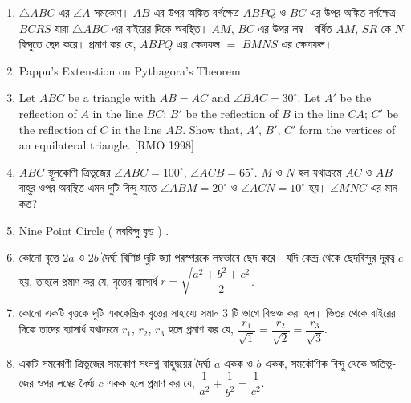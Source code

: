 \documentclass[11pt, a4paper]{article}
\begin{document}
\begin{enumerate}
	 
	 \item $ \bigtriangleup ABC $ \textbengali{এর} $ \angle A $ \textbengali{সমকোণ।} $AB$ \textbengali{এর উপর অঙ্কিত বর্গক্ষেত্র} $ABPQ$ \textbengali{ও} $BC$ \textbengali{এর উপর অঙ্কিত বর্গক্ষেত্র} $BCRS$ \textbengali{যারা} $ \bigtriangleup ABC $ \textbengali{এর বাইরের দিকে অবস্থিত।} $AM$, $BC$ \textbengali{এর উপর লম্ব। বর্ধিত} $AM$, $SR$ \textbengali{কে} $N$ \textbengali{বিন্দুতে ছেদ করে। প্রমাণ কর যে,} $ABPQ$ \textbengali{এর ক্ষেত্রফল} $=$ $BMNS$ \textbengali{এর ক্ষেত্রফল।}
	 
	 \item Pappu's Extenstion on Pythagora's Theorem.
	 
	 \item Let $ABC$ be a triangle with $AB = AC$ and $\angle BAC = 30^{\circ} $. Let $A'$ be the reflection of $A$ in the line $BC$; $B'$ be the reflection of $B$ in the line $CA$; $C'$ be the reflection of $C$ in the line $AB$. Show that, $A'$, $B'$, $C'$ form the vertices of an equilateral triangle. [RMO 1998]
	 
	 \item $ABC$ \textbengali{স্থূলকোণী ত্রিভুজের} $\angle ABC = 100^{\circ}$, $\angle ACB = 65^{\circ} $. $M$ \textbengali{ও} $N$ \textbengali{হল যথাক্রমে} $AC$ \textbengali{ও} $AB$ \textbengali{বাহুর ওপর অবস্থিত এমন দুটি বিন্দু যাতে} $\angle ABM = 20^{\circ} $ \textbengali{ও} $\angle ACN = 10^{\circ}$ \textbengali{হয়। } $\angle MNC $ \textbengali{এর মান কত?}
	 
	 \item Nine Point Circle ( \textbengali{নববিন্দু বৃত্ত} ) .
	 
	 \item \textbengali{কোনো বৃত্তে} $2a$ \textbengali{ও} $2b$ \textbengali{দৈর্ঘ্য বিশিষ্ট দুটি জ্যা পরস্পরকে লম্বভাবে ছেদ করে। যদি কেন্দ্র থেকে ছেদবিন্দুর দূরত্ব } $c$ \textbengali{হয়, তাহলে প্রমাণ কর যে, বৃত্তের ব্যাসার্ধ} $r = \sqrt{\dfrac{a^2 + b^2 + c^2}{2}}$.
	 
	 \item \textbengali{কোনো একটি বৃত্তকে দুটি এককেন্দ্রিক বৃত্তের সাহায্যে সমান} $3$ \textbengali{টি ভাগে বিভক্ত করা হল। ভিতর থেকে বাইরের দিকে তাদের ব্যাসার্ধ যথাক্রমে} $r_1$, $r_2$, $r_3$ \textbengali{হলে প্রমাণ কর যে,} $\dfrac{r_1}{\sqrt{1}} = \dfrac{r_2}{\sqrt{2}} = \dfrac{r_3}{\sqrt{3}}$.
	 
	 \item \textbengali{একটি সমকোণী ত্রিভুজের সমকোণ সংলগ্ন বাহুদ্বয়ের দৈর্ঘ্য} $a$ \textbengali{একক ও } $b$ \textbengali{একক, সমকৌণিক বিন্দু থেকে অতিভুজের ওপর লম্বের দৈর্ঘ্য} $c$ \textbengali{একক হলে প্রমাণ কর যে,} $\dfrac{1}{a^2} + \dfrac{1}{b^2} = \dfrac{1}{c^2}$.
	 

\end{enumerate}
\end{document}
